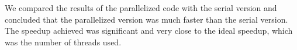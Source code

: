 \documentclass{article}
\begin{document}
We compared the results of the parallelized code with the serial version and 
concluded that the parallelized version was much faster than the serial version. 
The speedup achieved was significant and very close to the ideal speedup, which 
was the number of threads used.

\newpage



% 

\end{document}

